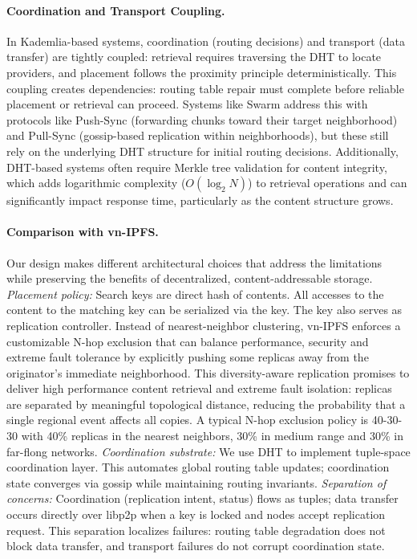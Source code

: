 \documentclass[runningheads]{llncs}
\begin{document}
\paragraph{Coordination and Transport Coupling.}
In Kademlia-based systems, coordination (routing decisions) and transport (data transfer) are tightly coupled: retrieval requires traversing the DHT to locate providers, and placement follows the proximity principle deterministically. This coupling creates dependencies: routing table repair must complete before reliable placement or retrieval can proceed. Systems like Swarm address this with protocols like Push-Sync (forwarding chunks toward their target neighborhood) and Pull-Sync (gossip-based replication within neighborhoods), but these still rely on the underlying DHT structure for initial routing decisions. Additionally, DHT-based systems often require Merkle tree validation for content integrity, which adds logarithmic complexity ($O(\log_2 N)$) to retrieval operations and can significantly impact response time, particularly as the content structure grows.

\paragraph{Comparison with vn-IPFS.}
Our design makes different architectural choices that address the limitations while preserving the benefits of decentralized, content-addressable storage. \emph{Placement policy:} Search keys are direct hash of contents. All accesses to the content to the matching key can be serialized via the key. The key also serves as replication controller. Instead of nearest-neighbor clustering, vn-IPFS enforces a customizable N-hop exclusion that can balance performance, security and extreme fault tolerance by explicitly pushing some replicas away from the originator's immediate neighborhood. This diversity-aware replication promises to deliver high performance content retrieval and extreme fault isolation: replicas are separated by meaningful topological distance, reducing the probability that a single regional event affects all copies. A typical N-hop exclusion policy is 40-30-30 with 40\% replicas in the nearest neighbors, 30\% in medium range and 30\% in far-flong networks. \emph{Coordination substrate:} We use DHT to implement tuple-space coordination layer. This automates global routing table updates; coordination state converges via gossip while maintaining routing invariants. \emph{Separation of concerns:} Coordination (replication intent, status) flows as tuples; data transfer occurs directly over libp2p when a key is locked and nodes accept replication request. This separation localizes failures: routing table degradation does not block data transfer, and transport failures do not corrupt coordination state.
\end{document}
